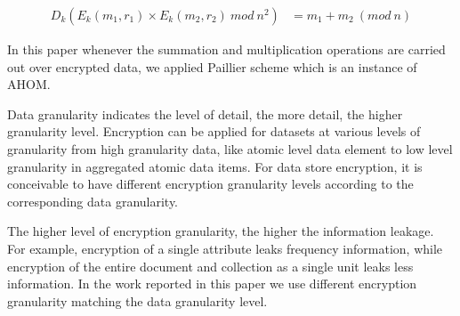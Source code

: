 \begin{equation} \label{eq4}
\begin{aligned}
D_k(E_k(m_1, r_1) \times E_k(m_2, r_2) ~mod ~n^2) & = m_1 + m_2~ (mod~ n) 
\end{aligned}
\end{equation}

In this paper whenever the summation and multiplication operations are carried out over encrypted data, we applied Paillier \cite{paillier1999public} scheme which is an instance of AHOM.

Data granularity indicates the level of detail, the more detail, the higher granularity level.
Encryption can be applied for datasets at various levels of granularity from high granularity data, like atomic level data element to low level granularity in aggregated atomic data items. For data store encryption, it is conceivable to have different encryption granularity levels according to the corresponding data granularity. 

The higher level of encryption granularity, the higher the information leakage. For example, encryption of a single attribute leaks frequency information, while encryption of the entire document and collection as a single unit leaks less information. In the work reported in this paper we use different encryption granularity matching the data granularity level.